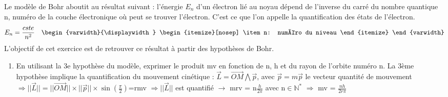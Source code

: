 \documentclass{article}
\begin{document}
Le modèle de Bohr aboutit au résultat suivant : l'énergie $E_{n}$ d'un électron lié au noyau dépend de l'inverse du carré du nombre quantique n, numéro de la couche électronique où peut se trouver l'électron. C'est ce que l'on appelle la quantification des états de l'électron.
\[
    E_{n} = \frac{cste}{n^{2}}
    \quad
    \begin{varwidth}{\displaywidth}
        \begin{itemize}[nosep]
            \item n: numéro du niveau 
        \end{itemize}
    \end{varwidth}
\]
L'objectif de cet exercice est de retrouver ce résultat à partir des hypothèses de Bohr.
\begin{enumerate}
    \item En utilisant la 3e hypothèse du modèle, exprimer le produit mv en fonction de n, h et du rayon de l'orbite numéro n.\newline
    La 3ème hypothèse implique la quantification du mouvement cinétique : $\overrightarrow{L}=\overrightarrow{OM}\bigwedge\overrightarrow{p}$, avec $\overrightarrow{p}=m\overrightarrow{p}$ le vecteur quantité de mouvement\newline
    $\Longrightarrow ||\overrightarrow{L}|| = ||\overrightarrow{OM}||\times||\overrightarrow{p}||\times\sin\left(\frac{\pi}{2}\right)$=rmv\newline
    $\Longrightarrow ||\overrightarrow{L}||$ est quantifié $\rightarrow$ mrv = n$\frac{h}{2\pi}$ avec n$\in\mathbb{N^{*}}$\newline
    $\Longrightarrow$ mv = $\frac{nh}{2r\pi}$
    

\end{enumerate}
\end{document}

